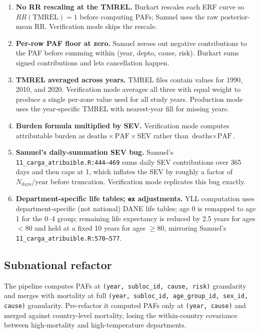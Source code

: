 \documentclass[11pt]{article}
\begin{document}
\begin{enumerate}
  \item \textbf{No RR rescaling at the TMREL.} Burkart rescales each ERF curve
    so $RR(\text{TMREL}) = 1$ before computing PAFs; Samuel uses the raw
    posterior-mean RR. Verification mode skips the rescale.
  \item \textbf{Per-row PAF floor at zero.} Samuel zeroes out negative
    contributions to the PAF before summing within (year, depto, cause, risk).
    Burkart sums signed contributions and lets cancellation happen.
  \item \textbf{TMREL averaged across years.} TMREL files contain values for
    1990, 2010, and 2020. Verification mode averages all three with equal
    weight to produce a single per-zone value used for all study years.
    Production mode uses the year-specific TMREL with nearest-year fill for
    missing years.
  \item \textbf{Burden formula multiplied by SEV.} Verification mode computes
    attributable burden as $\text{deaths} \times \text{PAF} \times \text{SEV}$
    rather than $\text{deaths} \times \text{PAF}$.
  \item \textbf{Samuel's daily-summation SEV bug.} Samuel's
    \texttt{11\_carga\_atribuible.R:444--469} sums daily SEV contributions
    over 365 days and then caps at 1, which inflates the SEV by roughly
    a factor of $N_{\text{days}}/\text{year}$ before truncation. Verification
    mode replicates this bug exactly.
  \item \textbf{Department-specific life tables; \texttt{ex} adjustments.}
    YLL computation uses department-specific (not national) DANE life tables;
    age 0 is remapped to age 1 for the 0--4 group; remaining life expectancy
    is reduced by 2.5 years for ages $<80$ and held at a fixed 10 years for
    ages $\geq 80$, mirroring Samuel's
    \texttt{11\_carga\_atribuible.R:570--577}.
\end{enumerate}

\subsection{Subnational refactor}

The pipeline computes PAFs at \texttt{(year, subloc\_id, cause, risk)}
granularity and merges with mortality at full
\texttt{(year, subloc\_id, age\_group\_id, sex\_id, cause)} granularity.
Pre-refactor it computed PAFs only at \texttt{(year, cause)} and merged
against country-level mortality, losing the within-country covariance
between high-mortality and high-temperature departments.
\end{document}

